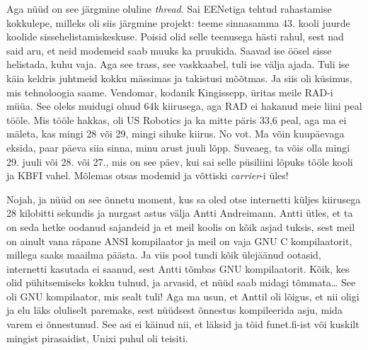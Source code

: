 Aga nüüd on see järgmine oluline \emph{thread}. Sai EENetiga 
tehtud rahastamise kokkulepe, milleks oli siis järgmine projekt: teeme 
sinnasamma 43. kooli juurde koolide 
sissehelistamiskeskuse. Poisid olid selle teenusega hästi rahul, sest nad said 
aru, et neid modemeid saab muuks ka pruukida. Saavad ise öösel sisse helistada, 
kuhu vaja. Aga see trass, see vaskkaabel, tuli ise välja ajada. Tuli ise käia 
keldris juhtmeid kokku mässimas ja takistusi mõõtmas. Ja siis oli küsimus, mis 
tehnoloogia saame. Vendomar, kodanik 
Kingissepp, üritas meile 
RAD-i müüa. See oleks muidugi olnud 64k kiirusega, aga RAD ei hakanud 
meie liini peal tööle. Mis tööle hakkas, oli US Robotics ja 
ka mitte päris 33,6 peal, aga ma ei mäleta, kas mingi 28 või 29, mingi sihuke 
kiirus. No vot. Ma võin kuupäevaga eksida, paar päeva siia sinna, minu arust 
juuli lõpp. Suveaeg, ta võis olla mingi 29. juuli või 28. või 27., mis on see 
päev, kui sai selle püsiliini  lõpuks tööle kooli ja KBFI vahel. 
Mõlemas otsas modemid ja võttiski \emph{carrier}-i üles! 

Nojah, ja nüüd on see õnnetu moment, kus sa oled otse internetti küljes 
kiirusega 28 kilobitti sekundis ja nurgast astus välja Antti 
Andreimann. Antti ütles, et ta on seda hetke 
oodanud sajandeid ja et meil koolis on kõik asjad tuksis, sest meil on ainult 
vana räpane ANSI kompilaator ja meil on vaja GNU C kompilaatorit, millega saaks 
maailma päästa. Ja viis pool tundi kõik ülejäänud ootasid, internetti kasutada 
ei saanud, sest Antti tõmbas GNU kompilaatorit. Kõik, kes olid pühitsemiseks 
kokku tulnud, ja arvasid, et nüüd saab midagi tõmmata\ldots {} See oli GNU 
kompilaator, mis sealt tuli! Aga ma usun, et Anttil oli lõigus, et  nii oligi 
ja elu läks oluliselt paremaks, sest nüüdsest õnnestus kompileerida asju, mida 
varem ei õnnestunud. See asi ei käinud nii, et läksid ja tõid 
funet.fi-ist või kuskilt mingist pirasaidist, Unixi puhul oli 
teisiti. 

